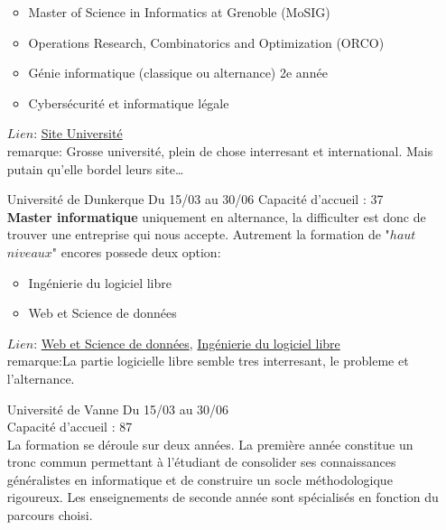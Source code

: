\documentclass[a4paper,11pt]{article}
\begin{document}
\begin{enumerate}
\begin{itemize}
                    \item Master of Science in Informatics at Grenoble (MoSIG)
                    \item Operations Research, Combinatorics and Optimization (ORCO) 
                    \item Génie informatique (classique ou alternance) 2e année
                    \item Cybersécurité et informatique légale
                \end{itemize}
                $Lien$: \href{https://im2ag.univ-grenoble-alpes.fr/menu-principal/formation/offre-de-formation/master-informatique/}{Site Université}\\
                remarque: Grosse université, plein de chose interresant et international. Mais putain qu'elle bordel leurs site\ldots
\\
        \item [\color{LightOrangeHaf}Université de Dunkerque] Du 15/03 au 30/06
                Capacité d'accueil : 37
                \\\textbf{Master informatique} uniquement en alternance, la difficulter est donc de trouver une entreprise qui nous accepte. Autrement la formation de "$haut$ $niveaux$" encores possede deux option:
                \begin{itemize}
                    \item Ingénierie du logiciel libre
                    \item Web et Science de données
                \end{itemize}
                $Lien$: \href{https://www.univ-littoral.fr/formation/offre-de-formation/masters/master-informatique-ingenierie-des-systemes-informatiques-distribues/}{Web et Science de données}, \href{https://www.univ-littoral.fr/formation/offre-de-formation/masters/master-informatique-ingenierie-du-logiciel-libre/}{Ingénierie du logiciel libre}\\
                remarque:La partie logicielle libre semble tres interresant, le probleme et l'alternance.
\\
        \item [\color{LightOrangeHaf}Université de Vanne] Du 15/03 au 30/06
                \\Capacité d'accueil : 87
                \\La formation se déroule sur deux années. La première année constitue un tronc commun permettant à l'étudiant de consolider ses connaissances généralistes en informatique et de construire un socle méthodologique rigoureux. Les enseignements de seconde année sont spécialisés en fonction du parcours choisi.

\end{enumerate}
\end{document}
